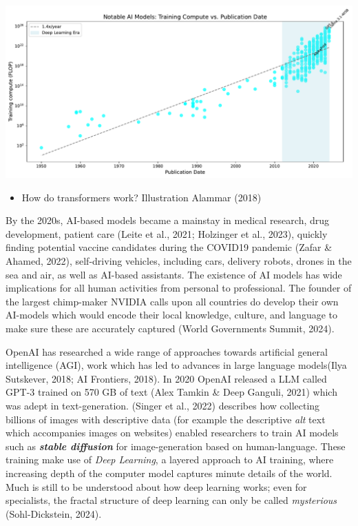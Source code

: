 \documentclass[
  letterpaper,
  DIV=11,
  numbers=noendperiod]{scrartcl}
\providecommand{\tightlist}{%
  \setlength{\itemsep}{0pt}\setlength{\parskip}{0pt}}\usepackage{longtable,booktabs,array}
\begin{document}
\includegraphics{_thesis_files/figure-pdf/cell-30-output-1.pdf}

\begin{itemize}
\tightlist
\item
  How do transformers work? Illustration Alammar (2018)
\end{itemize}

By the 2020s, AI-based models became a mainstay in medical research,
drug development, patient care (Leite et al., 2021; Holzinger et al.,
2023), quickly finding potential vaccine candidates during the COVID19
pandemic (Zafar \& Ahamed, 2022), self-driving vehicles, including cars,
delivery robots, drones in the sea and air, as well as AI-based
assistants. The existence of AI models has wide implications for all
human activities from personal to professional. The founder of the
largest chimp-maker NVIDIA calls upon all countries do develop their own
AI-models which would encode their local knowledge, culture, and
language to make sure these are accurately captured (World Governments
Summit, 2024).

OpenAI has researched a wide range of approaches towards artificial
general intelligence (AGI), work which has led to advances in large
language models(Ilya Sutskever, 2018; AI Frontiers, 2018). In 2020
OpenAI released a LLM called GPT-3 trained on 570 GB of text (Alex
Tamkin \& Deep Ganguli, 2021) which was adept in text-generation.
(Singer et al., 2022) describes how collecting billions of images with
descriptive data (for example the descriptive \emph{alt} text which
accompanies images on websites) enabled researchers to train AI models
such as \textbf{\emph{stable diffusion}} for image-generation based on
human-language. These training make use of \emph{Deep Learning}, a
layered approach to AI training, where increasing depth of the computer
model captures minute details of the world. Much is still to be
understood about how deep learning works; even for specialists, the
fractal structure of deep learning can only be called \emph{mysterious}
(Sohl-Dickstein, 2024).
\end{document}
